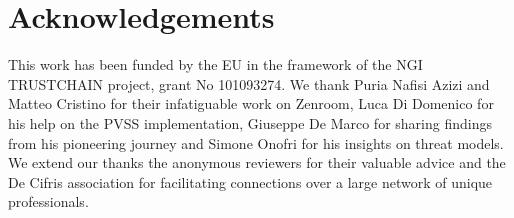 \section{Acknowledgements}
This work has been funded by the EU in the framework of the NGI
TRUSTCHAIN project, grant No 101093274. We thank Puria Nafisi Azizi
and Matteo Cristino for their infatiguable work on Zenroom, Luca Di
Domenico for his help on the PVSS implementation, Giuseppe De Marco
for sharing findings from his pioneering journey and Simone Onofri for
his insights on threat models. We extend our thanks the anonymous
reviewers for their valuable advice and the De Cifris association for
facilitating connections over a large network of unique professionals.





